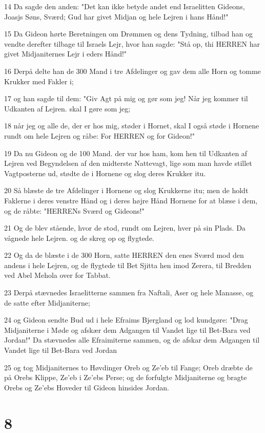 \par 14 Da sagde den anden: "Det kan ikke betyde andet end Israelitten Gideons, Joasjs Søns, Sværd; Gud har givet Midjan og hele Lejren i hans Hånd!"
\par 15 Da Gideon hørte Beretningen om Drømmen og dens Tydning, tilbad han og vendte derefter tilbage til Israels Lejr, hvor han sagde: "Stå op, thi HERREN har givet Midjaniternes Lejr i eders Hånd!"
\par 16 Derpå delte han de 300 Mand i tre Afdelinger og gav dem alle Horn og tomme Krukker med Fakler i;
\par 17 og han sagde til dem: "Giv Agt på mig og gør som jeg! Når jeg kommer til Udkanten af Lejren. skal I gøre som jeg;
\par 18 når jeg og alle de, der er hos mig, støder i Hornet, skal I også støde i Hornene rundt om hele Lejren og råbe: For HERREN og for Gideon!"
\par 19 Da nu Gideon og de 100 Mand. der var hos ham, kom hen til Udkanten af Lejren ved Begyndelsen af den midterste Nattevagt, lige som man havde stillet Vagtposterne ud, stødte de i Hornene og slog deres Krukker itu.
\par 20 Så blæste de tre Afdelinger i Hornene og slog Krukkerne itu; men de holdt Faklerne i deres venstre Hånd og i deres højre Hånd Hornene for at blæse i dem, og de råbte: "HERRENs Sværd og Gideons!"
\par 21 Og de blev stående, hvor de stod, rundt om Lejren, hver på sin Plads. Da vågnede hele Lejren. og de skreg op og flygtede.
\par 22 Og da de blæste i de 300 Horn, satte HERREN den enes Sværd mod den andens i hele Lejren, og de flygtede til Bet Sjitta hen imod Zerera, til Bredden ved Abel Mehola over for Tabbat.
\par 23 Derpå stævnedes Israelitterne sammen fra Naftali, Aser og hele Manasse, og de satte efter Midjaniterne;
\par 24 og Gideon sendte Bud ud i hele Efraims Bjergland og lod kundgøre: "Drag Midjaniterne i Møde og afskær dem Adgangen til Vandet lige til Bet-Bara ved Jordan!" Da stævnedes alle Efraimiterne sammen, og de afskar dem Adgangen til Vandet lige til Bet-Bara ved Jordan
\par 25 og tog Midjaniternes to Høvdinger Oreb og Ze'eb til Fange; Oreb dræbte de på Orebs Klippe, Ze'eb i Ze'ebs Perse; og de forfulgte Midjaniterne og bragte Orebs og Ze'ebs Hoveder til Gideon hinsides Jordan.

\chapter{8}

